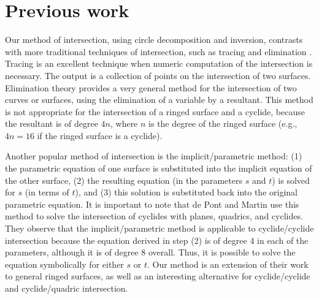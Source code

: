 %
%


% 

\section{Previous work}
\label{prev-wk}

Our method of intersection, using circle decomposition and inversion,
contrasts with more traditional techniques of intersection, such as
tracing and elimination \cite{HOF89}.
Tracing \cite{BHHL88} is an excellent technique 
when numeric computation of the intersection is necessary.
The output is a collection of points on the intersection 
of two surfaces.
Elimination theory provides a very general method for the intersection 
of two curves or surfaces, using the elimination of a variable by a 
resultant.
This method is not appropriate for the intersection of a ringed surface 
and a cyclide, because the resultant is of degree $4n$,
where $n$ is the degree of the ringed surface (e.g., $4n = 16$ if the ringed
surface is a cyclide).

Another popular method of intersection is the implicit/parametric method:
(1) the parametric equation of one surface is substituted into the implicit
equation of the other surface, (2) the resulting equation (in the
parameters $s$ and $t$) is solved for $s$ (in terms of $t$), 
and (3) this solution is substituted back into the original parametric 
equation.
It is important to note that de Pont and Martin \cite{DEP84,MDS86} use
this method to solve the intersection of cyclides with planes, quadrics,
and cyclides.
They observe that the implicit/parametric method is applicable to
cyclide/cyclide intersection because the equation derived in step (2)
is of degree 4 in each of the parameters, although it is of degree 8 overall.
Thus, it is possible to solve the equation symbolically for either $s$ or $t$.
Our method is an extension of their work to general ringed surfaces, as
well as an interesting alternative for cyclide/cyclide and cyclide/quadric
intersection.


